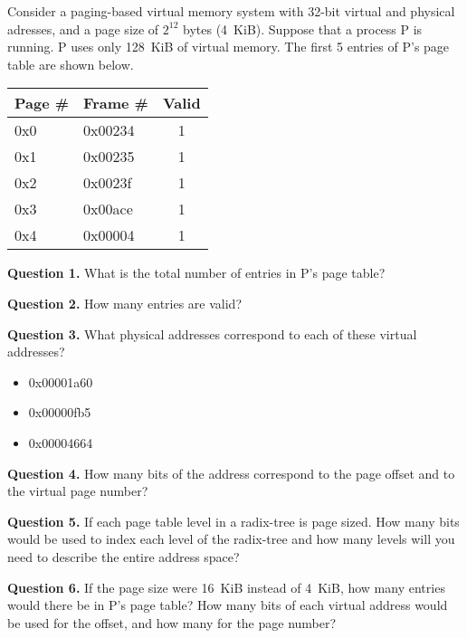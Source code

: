 \documentclass[letterpaper,twocolumn,10pt]{article}
\begin{document}
Consider a paging-based virtual memory system with 32-bit virtual and physical 
adresses, and a page size of $2^{12}$ bytes (4~KiB).  Suppose that a process P 
is running. P uses only 128~KiB of virtual memory.  The first 5 entries of P's 
page table are shown below.

\begin{table}
\centering
\begin{tabular}{l|l|c}
\toprule
Page \# & Frame \# & Valid \\
\midrule
0x0 & 0x00234 & 1\\
    0x1 & 0x00235 & 1\\
    0x2 & 0x0023f & 1\\
    0x3 & 0x00ace & 1\\
    0x4 & 0x00004 & 1\\
\bottomrule
\end{tabular}
\end{table}

\vspace{4em}

\noindent
\textbf{Question 1.} What is the total number of entries in P's page table?

\vspace{12em}

\noindent
\textbf{Question 2.} How many entries are valid?

\vspace{12em}

\textbf{Question 3.} What physical addresses correspond to each of these 
virtual addresses?

\begin{itemize}
\item 0x00001a60
\item 0x00000fb5
\item 0x00004664
\end{itemize}

\break

\textbf{Question 4.} How many bits of the address correspond to the page offset 
and to the virtual page number?

\vspace{14em}

\textbf{Question 5.} If each page table level in a radix-tree is page sized.  
How many bits would be used to index each level of the radix-tree and how many 
levels will you need to describe the entire address space?

\vspace{14em}

\textbf{Question 6.} If the page size were 16~KiB instead of 4~KiB, how many 
entries would there be in P's page table?  How many bits of each virtual 
address would be used for the offset, and how many for the page number?

\vspace{14em}
\end{document}
